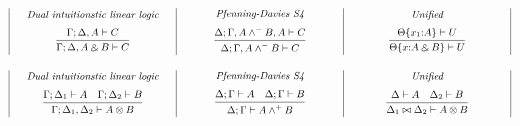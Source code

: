 \[\small
\begin{array}{|c|c|c|c|}
%
\begin{array}{c}
\makebox[1.8in]{\it Dual intuitionstic linear logic}\medskip
\\
\infer
{\Gamma; \Delta, A \with B \vdash C \mathstrut}
{\Gamma; \Delta, A \vdash C \mathstrut}
\end{array}
%
&
%
\begin{array}{c}
\makebox[1.8in]{\it Pfenning-Davies S4}\medskip
\\
\infer
{\Delta; \Gamma, A \wedge^- B \mathstrut \vdash C}
{\Delta; \Gamma, A \wedge^- B, A \vdash C \mathstrut}
\end{array}
%
&
%
\begin{array}{c}
\makebox[1.8in]{\it Unified}\medskip
\\
\infer
{\Theta\{ x{:} A \with B \} \vdash U \mathstrut}
{\Theta\{ x_1{:} A \} \vdash U \mathstrut}
\end{array}
%
\end{array}
\]


\[\small
\begin{array}{|c|c|c|c|}
%
\begin{array}{c}
\makebox[1.8in]{\it Dual intuitionstic linear logic}\medskip
\\
\infer
{\Gamma; \Delta_1, \Delta_2 \vdash A \otimes B \mathstrut}
{\Gamma; \Delta_1 \vdash A & \Gamma; \Delta_2 \vdash B \mathstrut}
\end{array}
%
&
%
\begin{array}{c}
\makebox[1.8in]{\it Pfenning-Davies S4}\medskip
\\
\infer
{\Delta; \Gamma \vdash A \wedge^+ B \mathstrut}
{\Delta; \Gamma \vdash A & \Delta; \Gamma \vdash B \mathstrut}
\end{array}
%
&
%
\begin{array}{c}
\makebox[1.8in]{\it Unified}\medskip
\\
\infer
{\Delta_1 \bowtie \Delta_2 \vdash A \otimes B \mathstrut}
{\Delta \vdash A & \Delta_2 \vdash B \mathstrut}
\end{array}
%
\end{array}
\]


